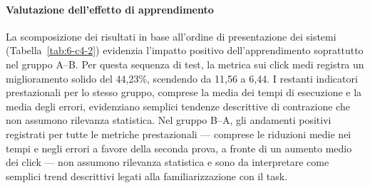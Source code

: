 \paragraph{Valutazione dell’effetto di apprendimento}

La scomposizione dei risultati in base all'ordine di presentazione dei sistemi (Tabella~\ref{tab:6-c4-2}) evidenzia l'impatto positivo dell'apprendimento soprattutto nel gruppo A--B. Per questa sequenza di test, la metrica sui click medi registra un miglioramento solido del 44,23\%, scendendo da 11,56 a 6,44. I restanti indicatori prestazionali per lo stesso gruppo, comprese la media dei tempi di esecuzione e la media degli errori, evidenziano semplici tendenze descrittive di contrazione che non assumono rilevanza statistica. Nel gruppo B--A, gli andamenti positivi registrati per tutte le metriche prestazionali — comprese le riduzioni medie nei tempi e negli errori a favore della seconda prova, a fronte di un aumento medio dei click — non assumono rilevanza statistica e sono da interpretare come semplici trend descrittivi legati alla familiarizzazione con il task.

